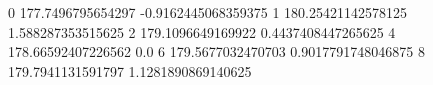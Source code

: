 0 177.7496795654297 -0.9162445068359375
1 180.25421142578125 1.588287353515625
2 179.1096649169922 0.4437408447265625
4 178.66592407226562 0.0
6 179.5677032470703 0.9017791748046875
8 179.7941131591797 1.1281890869140625
